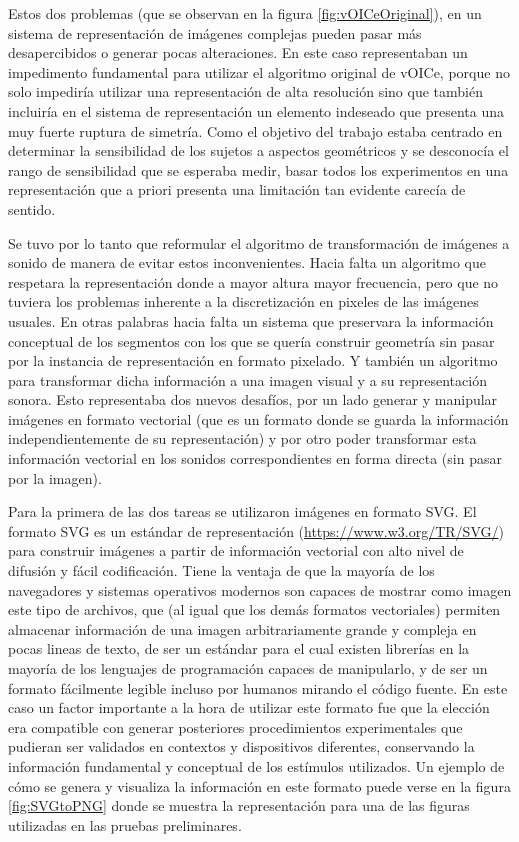 \documentclass{article}
\numberwithin{figure}{section}
\begin{document}
    Estos dos problemas (que se observan en la figura \ref{fig:vOICeOriginal}), en un sistema de representación de imágenes complejas pueden pasar más desapercibidos o generar pocas alteraciones. En este caso representaban un impedimento fundamental para utilizar el algoritmo original de vOICe, porque no solo impediría utilizar una representación de alta resolución sino que también incluiría en el sistema de representación un elemento indeseado que presenta una muy fuerte ruptura de simetría. Como el objetivo del trabajo estaba centrado en determinar la sensibilidad de los sujetos a aspectos geométricos y se desconocía el rango de sensibilidad que se esperaba medir, basar todos los experimentos en una representación que a priori presenta una limitación tan evidente carecía de sentido. 
    
    Se tuvo por lo tanto que reformular el algoritmo de transformación de imágenes a sonido de manera de evitar estos inconvenientes. Hacia falta un algoritmo que respetara la representación donde a mayor altura mayor frecuencia, pero que no tuviera los problemas inherente a la discretización en pixeles de las imágenes usuales. En otras palabras hacia falta un sistema que preservara la información conceptual de los segmentos con los que se quería construir geometría sin pasar por la instancia de representación en formato pixelado. Y también un algoritmo para transformar dicha información a una imagen visual y a su representación sonora. Esto representaba dos nuevos desafíos, por un lado generar y manipular imágenes en formato vectorial (que es un formato donde se guarda la información independientemente de su representación) y por otro poder transformar esta información vectorial en los sonidos correspondientes en forma directa (sin pasar por la imagen). 
    
    Para la primera de las dos tareas se utilizaron imágenes en formato SVG. El formato SVG es un estándar de representación (\url{https://www.w3.org/TR/SVG/}) para construir imágenes a partir de información vectorial con alto nivel de difusión y fácil codificación. Tiene la ventaja de que la mayoría de los navegadores y sistemas operativos modernos son capaces de mostrar como imagen este tipo de archivos, que (al igual que los demás formatos vectoriales) permiten almacenar información de una imagen arbitrariamente grande y compleja en pocas lineas de texto, de ser un estándar para el cual existen librerías en la mayoría de los lenguajes de programación capaces de manipularlo, y de ser un formato fácilmente legible incluso por humanos mirando el código fuente. En este caso un factor importante a la hora de utilizar este formato fue que la elección era compatible con generar posteriores procedimientos experimentales que pudieran ser validados en contextos y dispositivos diferentes, conservando la información fundamental y conceptual de los estímulos utilizados. Un ejemplo de cómo se genera y visualiza la información en este formato puede verse en la figura \ref{fig:SVGtoPNG} donde se muestra la representación para una de las figuras utilizadas en las pruebas preliminares. 
    
\end{document}
